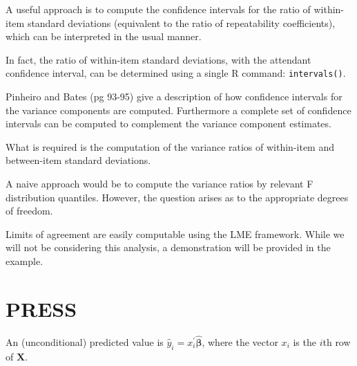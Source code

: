 \documentclass[12pt, a4paper]{report}
\theoremstyle{plain}
\theoremstyle{definition}
\theoremstyle{remark}
\begin{document}
A useful approach is to compute the confidence intervals for the ratio of within-item standard deviations (equivalent to the ratio of repeatability coefficients), which can be interpreted in the usual manner.  

In fact, the ratio of within-item standard deviations, with the attendant confidence interval,  can be determined using a single R command: \texttt{intervals()}.

Pinheiro and Bates (pg 93-95) give a description of how confidence intervals for the variance components are computed. Furthermore a complete set of confidence intervals can be computed to complement the variance component estimates. 

What is required is the computation of the variance ratios of within-item and between-item standard deviations.  

A naive  approach would be to compute the variance ratios by relevant F distribution quantiles. However, the question arises as to the appropriate degrees of freedom.

Limits of agreement are easily computable using the LME framework. While we will not be considering this analysis, a demonstration will be provided in the example.


\section{PRESS}
	
	
	
	
	
	An (unconditional) predicted value is $\hat{y}_i = x^{\prime}_i \boldsymbol{\hat{\beta}}$, where
	the vector $x_i$ is the $i$th row of $\boldsymbol{X}$.
	
	
\end{document}
